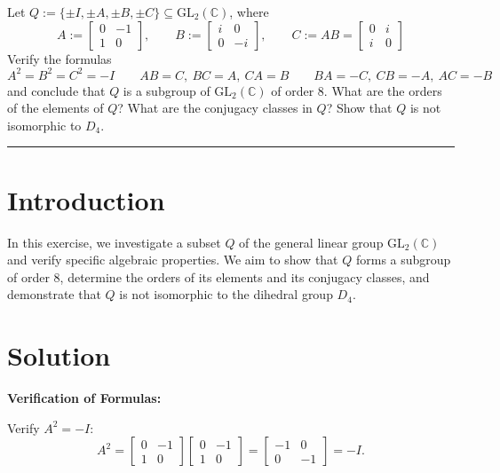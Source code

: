 \documentclass[12pt]{amsart}
\theoremstyle{definition}
\numberwithin{equation}{section}
\renewcommand{\C}{\mathbb{C}}
\begin{document}
\begin{exercise}{6} Let \(Q := \{\pm I, \pm A, \pm B, \pm C\} \subseteq \text{GL}_2(\C) \), where \[A := \begin{bmatrix}
    0 & -1 \\ 1 & 0 \end{bmatrix}, \qquad B := \begin{bmatrix} i & 0 \\ 0 & -i \end{bmatrix}, \qquad C := AB = \begin{bmatrix} 0 & i \\ i & 0 \end{bmatrix}\] Verify the formulas \[A^2 = B^2 = C^2 = -I \qquad AB = C, \ BC = A, \ CA = B \qquad BA = -C, \ CB = -A, \ AC = -B\] 
    and conclude that \(Q\) is a subgroup of \(\text{GL}_2(\C) \) of order 8. What are the orders of the elements of \(Q\)? What are the conjugacy classes in \(Q\)? Show that \(Q\) is not isomorphic to \(D_4\).

    \noindent\rule{\linewidth}{1pt}

    \section*{Introduction}
    
    In this exercise, we investigate a subset \(Q\) of the general linear group \(\text{GL}_2(\C)\) and verify specific algebraic properties. We aim to show that \(Q\) forms a subgroup of order 8, determine the orders of its elements and its conjugacy classes, and demonstrate that \(Q\) is not isomorphic to the dihedral group \(D_4\).

    \section*{Solution}
    
    \noindent \textbf{Verification of Formulas:}

    \noindent Verify \(A^2 = -I\):
    \[
    A^2 = \begin{bmatrix} 0 & -1 \\ 1 & 0 \end{bmatrix} \begin{bmatrix} 0 & -1 \\ 1 & 0 \end{bmatrix} = \begin{bmatrix} -1 & 0 \\ 0 & -1 \end{bmatrix} = -I.
    \]


\end{exercise}
\end{document}
